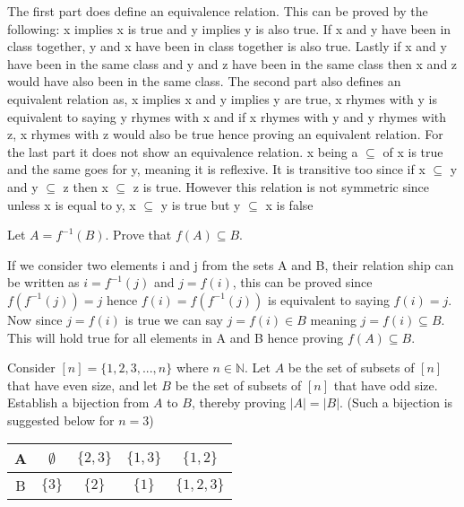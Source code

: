 \documentclass[addpoints]{exam}
\begin{document}
\begin{questions}
\begin{parts}
  \begin{solution}
    The first part does define an equivalence relation. This can be proved by the following: x implies x is true and y implies y is also true. If x and y have been in class together, y and x have been in class together is also true. Lastly if x and y have been in the same class and y and z have been in the same class then x and z would have also been in the same class.
    \newline \newline
    The second part also defines an equivalent relation as, x implies x and y implies y are true, x rhymes with y is equivalent to saying y rhymes with x and if x rhymes with y and y rhymes with z, x rhymes with z would also be true hence proving an equivalent relation.
    \newline \newline
    For the last part it does not show an equivalence relation. x being a $\subseteq$ of x is true and the same goes for y, meaning it is reflexive. It is transitive too since if x $\subseteq$ y and y $\subseteq$ z then x $\subseteq$ z is true. However this relation is not symmetric since unless x is equal to y, x $\subseteq$ y is true but y $\subseteq$ x is false 
  \end{solution}

\end{parts}

\question[15] Let $A = f^{-1}(B)$. Prove that $f(A) \subseteq B$.
  \begin{solution}
    If we consider two elements i and j from the sets A and B, their relation ship can be written as $i = f^{-1}(j)$ and $j=f(i)$, this can be proved since $f(f^{-1}(j))=j$ hence $f(i) = f(f^{-1}(j))$ is equivalent to saying $f(i) = j$. Now since $j=f(i)$ is true we can say $j=f(i) \in B$ meaning $j=f(i) \subseteq B$. This will hold true for all elements in A and B hence proving $f(A) \subseteq B$.
  \end{solution}

\question[15] Consider $[n] = \{1,2,3,...,n\}$ where $n \in \mathbb{N}$. Let $A$ be the set of subsets of $[n]$ that have even size, and let $B$ be the set of subsets of $[n]$ that have odd size. Establish a bijection from $A$ to $B$, thereby proving $|A| = |B|$. (Such a bijection is suggested below for $n = 3$) 

\begin{center}

  \begin{tabular}{ |c || c | c | c |c |}
    \hline
 A & $\emptyset$ & $\{2,3\}$ & $\{1,3\}$ & $\{1,2\}$ \\ \hline
 B & $\{3\}$ & $\{2\}$ & $\{1\}$ & $\{1,2,3\}$\\\hline
\end{tabular}
\end{center}


\end{questions}
\end{document}
